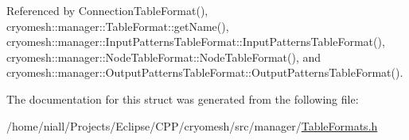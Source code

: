 \-Referenced by \-Connection\-Table\-Format(), cryomesh\-::manager\-::\-Table\-Format\-::get\-Name(), cryomesh\-::manager\-::\-Input\-Patterns\-Table\-Format\-::\-Input\-Patterns\-Table\-Format(), cryomesh\-::manager\-::\-Node\-Table\-Format\-::\-Node\-Table\-Format(), and cryomesh\-::manager\-::\-Output\-Patterns\-Table\-Format\-::\-Output\-Patterns\-Table\-Format().



\-The documentation for this struct was generated from the following file\-:\begin{DoxyCompactItemize}
\item 
/home/niall/\-Projects/\-Eclipse/\-C\-P\-P/cryomesh/src/manager/\hyperlink{TableFormats_8h}{\-Table\-Formats.\-h}\end{DoxyCompactItemize}
